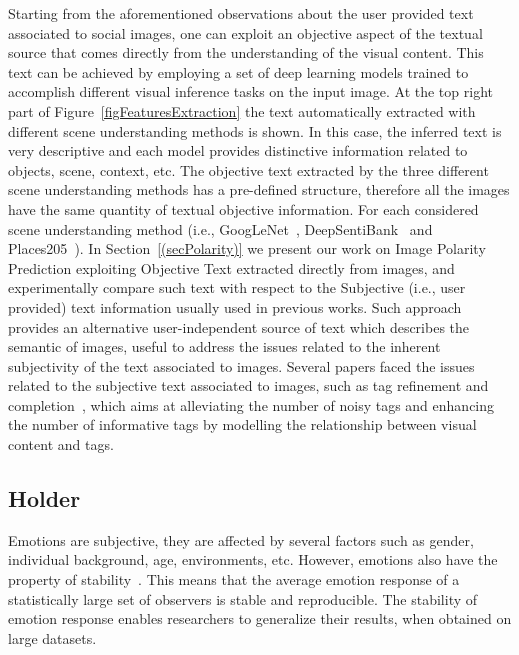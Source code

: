 Starting from the aforementioned observations about the user provided text associated to social images, one can exploit an objective aspect of the textual source that comes directly from the understanding of the visual content. This text can be achieved by employing a set of deep learning models trained to accomplish different visual inference tasks on the input image. At the top right part of Figure~\ref{figFeaturesExtraction} the text automatically extracted with different scene understanding methods is shown. In this case, the inferred text is very descriptive and each model provides distinctive information related to objects, scene, context, etc.
The objective text extracted by the three different scene understanding methods has a pre-defined structure, therefore all the images have the same quantity of textual objective information. For each considered scene understanding method (i.e., GoogLeNet~\cite{googlenet}, DeepSentiBank~\cite{chen2014deepsentibank} and Places205~\cite{zhou2014learning}). 
In Section~\ref{(secPolarity)} we present our work on Image Polarity Prediction exploiting Objective Text extracted directly from images, and experimentally compare such text with respect to the Subjective (i.e., user provided) text information usually used in previous works.
Such approach provides an alternative user-independent source of text which describes the semantic of images, useful to address the issues related to the inherent subjectivity of the text associated to images.
Several papers faced the issues related to the subjective text associated to images, such as tag refinement and completion~\cite{li2016socializing,sang2012user,xu2009tag,wu2013tag}, which aims at alleviating the number of noisy tags and enhancing the number of informative tags by modelling the relationship between visual content and tags.

\subsection{Holder}
Emotions are subjective, they are affected by several factors such as gender, individual background, age, environments, etc. However, emotions also have the property of stability~\cite{wang2008survey}. This means that the average emotion response of a statistically large set of observers is stable and reproducible. The stability of emotion response enables researchers to generalize their results, when obtained on large datasets.

